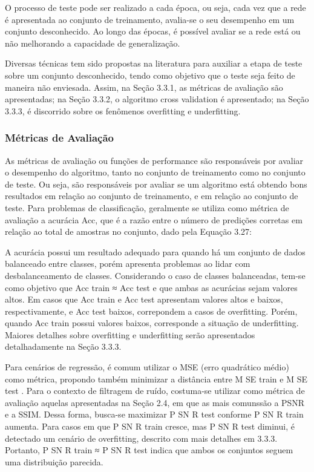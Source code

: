 O processo de teste pode ser realizado a cada época, ou seja, cada vez que a rede é apresentada ao conjunto de treinamento, avalia-se o seu desempenho em um conjunto desconhecido. Ao longo das épocas, é possível avaliar se a rede está ou não melhorando a capacidade de generalização.

Diversas técnicas tem sido propostas na literatura para auxiliar a etapa de teste sobre um conjunto desconhecido, tendo como objetivo que o teste seja feito de maneira não enviesada. Assim, na Seção 3.3.1, as métricas de avaliação são apresentadas; na Seção 3.3.2, o algoritmo cross validation é apresentado; na Seção 3.3.3, é discorrido sobre os fenômenos overfitting e underfitting.


\subsubsection{Métricas de Avaliação}

As métricas de avaliação ou funções de performance são responsáveis por avaliar o desempenho do algoritmo, tanto no conjunto de treinamento como no conjunto de teste. Ou seja, são responsáveis por avaliar se um algoritmo está obtendo bons resultados em relação ao conjunto de treinamento, e em relação ao conjunto de teste. Para problemas de classificação, geralmente se utiliza como métrica de avaliação a acurácia Acc, que é a razão entre o número de predições corretas em relação ao total de amostras no conjunto, dado pela Equação 3.27:

A acurácia possui um resultado adequado para quando há um conjunto de dados balanceado entre classes, porém apresenta problemas ao lidar com desbalanceamento de classes. Considerando o caso de classes balanceadas, tem-se como objetivo que Acc train ≈ Acc test e que ambas as acurácias sejam valores altos. Em casos que Acc train e Acc test apresentam valores altos e baixos, respectivamente, e Acc test baixos, correpondem a casos de overfitting. Porém, quando Acc train possui valores baixos, corresponde a situação de underfitting. Maiores detalhes sobre overfitting e underfitting serão apresentados detalhadamente na Seção 3.3.3.

Para cenários de regressão, é comum utilizar o MSE (erro quadrático médio) como métrica, propondo também minimizar a distância entre M SE train e M SE test . Para o contexto de filtragem de ruído, costuma-se utilizar como métrica de avaliação aquelas apresentadas na Seção 2.4, em que as mais comunssão a PSNR e a SSIM. Dessa forma, busca-se maximizar P SN R test conforme P SN R train aumenta. Para casos em que P SN R train cresce, mas P SN R test diminui, é detectado um cenário de overfitting, descrito com mais detalhes em 3.3.3. Portanto, P SN R train ≈ P SN R test indica que ambos os conjuntos seguem uma distribuição parecida.


